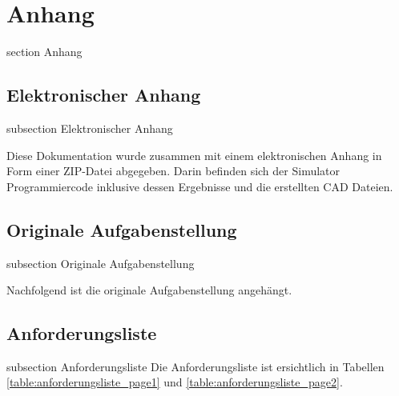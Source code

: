 \newpage

\section*{Anhang}
    {section}
    {Anhang}



\subsection*{Elektronischer Anhang}\label{elect-anhang}
{subsection}
{Elektronischer Anhang}

Diese Dokumentation wurde zusammen mit einem elektronischen Anhang in Form einer ZIP-Datei abgegeben. Darin befinden sich der Simulator Programmiercode inklusive dessen Ergebnisse und die erstellten CAD Dateien.

\newpage

\newpage


\subsection*{Originale Aufgabenstellung}\label{aufgabenstellung}
{subsection}
{Originale Aufgabenstellung}

Nachfolgend ist die originale Aufgabenstellung angehängt.




\subsection*{Anforderungsliste}\label{anforderungliste}
    {subsection}
    {Anforderungsliste}
Die  Anforderungsliste ist ersichtlich in Tabellen \ref{table:anforderungsliste_page1} und \ref{table:anforderungsliste_page2}.

